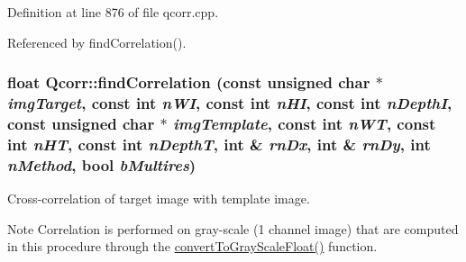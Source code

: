 Definition at line 876 of file qcorr.cpp.

Referenced by findCorrelation().\hypertarget{classQcorr_aa867dbbe79fe720631216eec154a12e2}{
\subsubsection[{findCorrelation}]{\setlength{\rightskip}{0pt plus 5cm}float Qcorr::findCorrelation (const unsigned char $\ast$ {\em imgTarget}, \/  const int {\em nWI}, \/  const int {\em nHI}, \/  const int {\em nDepthI}, \/  const unsigned char $\ast$ {\em imgTemplate}, \/  const int {\em nWT}, \/  const int {\em nHT}, \/  const int {\em nDepthT}, \/  int \& {\em rnDx}, \/  int \& {\em rnDy}, \/  int {\em nMethod}, \/  bool {\em bMultires})}}
\label{classQcorr_aa867dbbe79fe720631216eec154a12e2}


Cross-\/correlation of target image with template image. \begin{DoxyNote}{Note}
Correlation is performed on gray-\/scale (1 channel image) that are computed in this procedure through the \hyperlink{classQcorr_ad1b26ace597c0c4a0f64a0bd9576d4fc}{convertToGrayScaleFloat()} function. 
\end{DoxyNote}

